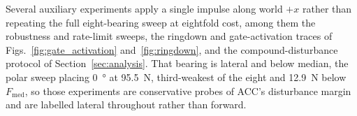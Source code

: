 \documentclass[a4paper,fleqn]{cas-dc}
\renewcommand{\textfraction}{0.07}
\begin{document}
Several auxiliary experiments apply a single impulse along world $+x$ rather than
repeating the full eight-bearing sweep at eightfold cost, among them the
robustness and rate-limit sweeps, the ringdown and gate-activation traces of
Figs.~\ref{fig:gate_activation} and~\ref{fig:ringdown}, and the
compound-disturbance protocol of Section~\ref{sec:analysis}. That bearing is
lateral and below median, the polar sweep placing \SI{0}{\degree} at
\SI{95.5}{N}, third-weakest of the eight and \SI{12.9}{N} below
$F_{\text{med}}$, so those experiments are conservative probes of ACC's
disturbance margin and are labelled lateral throughout rather than forward.

\end{document}
